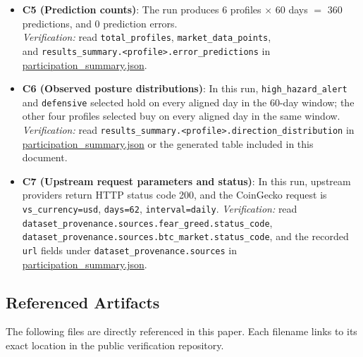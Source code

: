 \documentclass[12pt,a4paper]{article}
\begin{document}
\begin{itemize}
	\item \textbf{C5 (Prediction counts)}: The run produces 6 profiles $\times$ 60 days $=$ 360 predictions, and 0 prediction errors. \\
	\emph{Verification:} read \texttt{total\_profiles}, \texttt{market\_data\_points}, \\
    and \texttt{results\_summary.<profile>.error\_predictions} in \href{https://github.com/jhcragin/SpiralBrain-v3.0-public/blob/main/Emotion-Conditioned%20Risk%20Posture%20in%20Crypto%20Markets/results/participation_summary.json}{participation_summary.json}.

	\item \textbf{C6 (Observed posture distributions)}: In this run, \texttt{high\_hazard\_alert} and \texttt{defensive} selected hold on every aligned day in the 60-day window; the other four profiles selected buy on every aligned day in the same window. \\
	\emph{Verification:} read \texttt{results\_summary.<profile>.direction\_distribution} in \href{https://github.com/jhcragin/SpiralBrain-v3.0-public/blob/main/Emotion-Conditioned%20Risk%20Posture%20in%20Crypto%20Markets/results/participation_summary.json}{participation_summary.json} or the generated table included in this document.

	\item \textbf{C7 (Upstream request parameters and status)}: In this run, upstream providers return HTTP status code 200, and the CoinGecko request is \texttt{vs\_currency=usd}, \texttt{days=62}, \texttt{interval=daily}.
	\emph{Verification:} read \\ \texttt{dataset\_provenance.sources.fear\_greed.status\_code}, \\ \texttt{dataset\_provenance.sources.btc\_market.status\_code}, and the recorded \texttt{url} fields under \texttt{dataset\_provenance.sources} in \href{https://github.com/jhcragin/SpiralBrain-v3.0-public/blob/main/Emotion-Conditioned%20Risk%20Posture%20in%20Crypto%20Markets/results/participation_summary.json}{participation_summary.json}.
\end{itemize}

\subsection*{Referenced Artifacts}

The following files are directly referenced in this paper. Each filename links to its exact location in the public verification repository.
\end{document}
